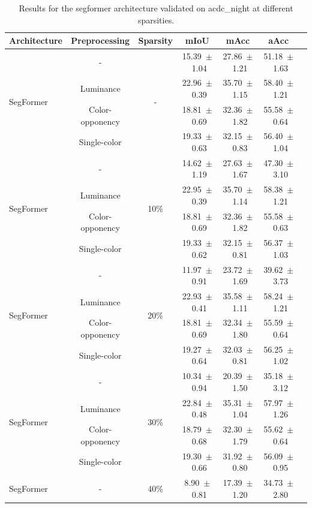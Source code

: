 \begin{table}[h]
\centering
\caption{Results for the segformer architecture validated on acdc_night at different sparsities.}
\begin{tabular}{@{}lccc ccc@{}}
\toprule
Architecture & Preprocessing & Sparsity & mIoU & mAcc & aAcc \\
\midrule

\multirow{4}{*}{SegFormer} & - & \multirow{4}{*}{-} & 15.39~$\pm$~1.04 & 27.86~$\pm$~1.21 & 51.18~$\pm$~1.63 \\
& Luminance & & 22.96~$\pm$~0.39 & 35.70~$\pm$~1.15 & 58.40~$\pm$~1.21 \\
& Color-opponency & & 18.81~$\pm$~0.69 & 32.36~$\pm$~1.82 & 55.58~$\pm$~0.64 \\
& Single-color & & 19.33~$\pm$~0.63 & 32.15~$\pm$~0.83 & 56.40~$\pm$~1.04 \\
\midrule
\multirow{4}{*}{SegFormer} & - & \multirow{4}{*}{10\%} & 14.62~$\pm$~1.19 & 27.63~$\pm$~1.67 & 47.30~$\pm$~3.10 \\
& Luminance & & 22.95~$\pm$~0.39 & 35.70~$\pm$~1.14 & 58.38~$\pm$~1.21 \\
& Color-opponency & & 18.81~$\pm$~0.69 & 32.36~$\pm$~1.82 & 55.58~$\pm$~0.63 \\
& Single-color & & 19.33~$\pm$~0.62 & 32.15~$\pm$~0.81 & 56.37~$\pm$~1.03 \\
\midrule
\multirow{4}{*}{SegFormer} & - & \multirow{4}{*}{20\%} & 11.97~$\pm$~0.91 & 23.72~$\pm$~1.69 & 39.62~$\pm$~3.73 \\
& Luminance & & 22.93~$\pm$~0.41 & 35.58~$\pm$~1.11 & 58.24~$\pm$~1.21 \\
& Color-opponency & & 18.81~$\pm$~0.69 & 32.34~$\pm$~1.80 & 55.59~$\pm$~0.64 \\
& Single-color & & 19.27~$\pm$~0.64 & 32.03~$\pm$~0.81 & 56.25~$\pm$~1.02 \\
\midrule
\multirow{4}{*}{SegFormer} & - & \multirow{4}{*}{30\%} & 10.34~$\pm$~0.94 & 20.39~$\pm$~1.50 & 35.18~$\pm$~3.12 \\
& Luminance & & 22.84~$\pm$~0.48 & 35.31~$\pm$~1.04 & 57.97~$\pm$~1.26 \\
& Color-opponency & & 18.79~$\pm$~0.68 & 32.30~$\pm$~1.79 & 55.62~$\pm$~0.64 \\
& Single-color & & 19.30~$\pm$~0.66 & 31.92~$\pm$~0.80 & 56.09~$\pm$~0.95 \\
\midrule
\multirow{4}{*}{SegFormer} & - & \multirow{4}{*}{40\%} & 8.90~$\pm$~0.81 & 17.39~$\pm$~1.20 & 34.73~$\pm$~2.80 \\

\end{tabular}
\end{table}
